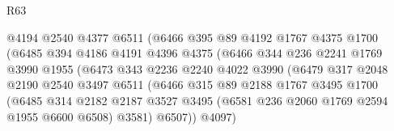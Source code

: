 \begin{lexlean}{R63}
\begin{coremodule}
                                  @4194
                                  @2540
                                  @4377
                                  @6511
                                  (@6466
                                    @395
                                    @89
                                    @4192
                                    @1767
                                    @4375
                                    @1700
                                    (@6485
                                      @394
                                      @4186
                                      @4191
                                      @4396
                                      @4375
                                      (@6466
                                        @344
                                        @236
                                        @2241
                                        @1769
                                        @3990
                                        @1955
                                        (@6473
                                          @343
                                          @2236
                                          @2240
                                          @4022
                                          @3990
                                          (@6479
                                            @317
                                            @2048
                                            @2190
                                            @2540
                                            @3497
                                            @6511
                                            (@6466
                                              @315
                                              @89
                                              @2188
                                              @1767
                                              @3495
                                              @1700
                                              (@6485
                                                @314
                                                @2182
                                                @2187
                                                @3527
                                                @3495
                                                (@6581 @236 @2060 @1769 @2594 @1955 @6600 @6508)
                                                @3581)
                                              @6507))
                                          @4097)

\end{coremodule}
\end{lexlean}
